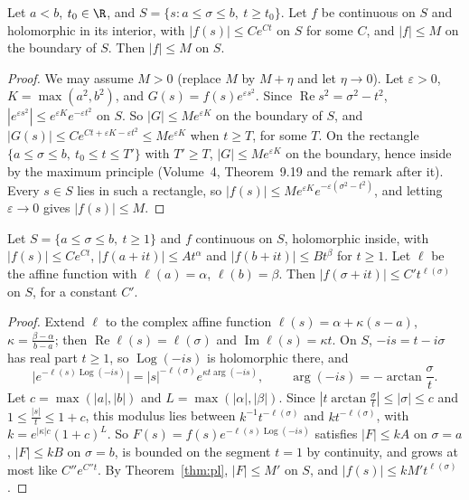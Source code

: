 \begin{theorem}\label{thm:pl}
Let $a<b$, $t_0\in\R$, and $S=\{s:a\le\sigma\le b,\ t\ge t_0\}$. Let $f$ be continuous on $S$ and holomorphic in its interior, with $|f(s)|\le Ce^{Ct}$ on $S$ for some $C$, and $|f|\le M$ on the boundary of $S$.
Then $|f|\le M$ on $S$.
\end{theorem}
\begin{proof}
We may assume $M>0$ (replace $M$ by $M+\eta$ and let $\eta\to0$). Let $\varepsilon>0$, $K=\max(a^2,b^2)$, and $G(s)=f(s)e^{\varepsilon s^2}$. Since $\operatorname{Re}s^2=\sigma^2-t^2$, $|e^{\varepsilon s^2}|\le e^{\varepsilon K}e^{-\varepsilon t^2}$ on $S$. So
$|G|\le Me^{\varepsilon K}$ on the boundary of $S$, and $|G(s)|\le Ce^{Ct+\varepsilon K-\varepsilon t^2}\le Me^{\varepsilon K}$ when $t\ge T$, for some $T$. On the rectangle $\{a\le\sigma\le b,\ t_0\le t\le T'\}$ with $T'\ge T$,
$|G|\le Me^{\varepsilon K}$ on the boundary, hence inside by the maximum principle (Volume~4, Theorem~9.19 and the remark after it). Every $s\in S$ lies in such a rectangle, so
$|f(s)|\le Me^{\varepsilon K}e^{-\varepsilon(\sigma^2-t^2)}$, and letting $\varepsilon\to0$ gives $|f(s)|\le M$.
\end{proof}

\begin{corollary}[convexity]\label{cor:convexity}
Let $S=\{a\le\sigma\le b,\ t\ge1\}$ and $f$ continuous on $S$, holomorphic inside, with $|f(s)|\le Ce^{Ct}$, $|f(a+it)|\le At^\alpha$ and $|f(b+it)|\le Bt^\beta$ for $t\ge1$. Let $\ell$ be the affine function with
$\ell(a)=\alpha$, $\ell(b)=\beta$. Then $|f(\sigma+it)|\le C't^{\ell(\sigma)}$ on $S$, for a constant $C'$.
\end{corollary}
\begin{proof}
Extend $\ell$ to the complex affine function $\ell(s)=\alpha+\kappa(s-a)$, $\kappa=\frac{\beta-\alpha}{b-a}$; then $\operatorname{Re}\ell(s)=\ell(\sigma)$ and $\operatorname{Im}\ell(s)=\kappa t$. On $S$, $-is=t-i\sigma$ has real part
$t\ge1$, so $\operatorname{Log}(-is)$ is holomorphic there, and
\[
\bigl|e^{-\ell(s)\operatorname{Log}(-is)}\bigr|=|s|^{-\ell(\sigma)}e^{\kappa t\arg(-is)},\qquad\arg(-is)=-\arctan\frac\sigma t.
\]
Let $c=\max(|a|,|b|)$ and $L=\max(|\alpha|,|\beta|)$. Since $|t\arctan\frac\sigma t|\le|\sigma|\le c$ and $1\le\frac{|s|}t\le1+c$, this modulus lies between $k^{-1}t^{-\ell(\sigma)}$ and $kt^{-\ell(\sigma)}$, with
$k=e^{|\kappa|c}(1+c)^L$. So $F(s)=f(s)e^{-\ell(s)\operatorname{Log}(-is)}$ satisfies $|F|\le kA$ on $\sigma=a$, $|F|\le kB$ on $\sigma=b$, is bounded on the segment $t=1$ by continuity, and grows at most like
$C''e^{C''t}$. By Theorem~\ref{thm:pl}, $|F|\le M'$ on $S$, and $|f(s)|\le kM't^{\ell(\sigma)}$.
\end{proof}


